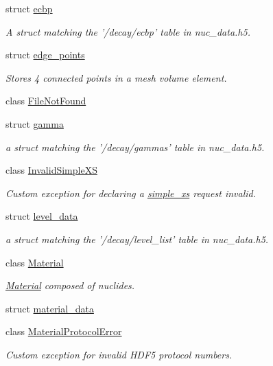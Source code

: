\begin{DoxyCompactItemize}
struct \hyperlink{structpyne_1_1ecbp}{ecbp}
\begin{DoxyCompactList}\small\item\em A struct matching the '/decay/ecbp' table in nuc\+\_\+data.\+h5. \end{DoxyCompactList}\item 
struct \hyperlink{structpyne_1_1edge__points}{edge\+\_\+points}
\begin{DoxyCompactList}\small\item\em Stores 4 connected points in a mesh volume element. \end{DoxyCompactList}\item 
class \hyperlink{classpyne_1_1_file_not_found}{File\+Not\+Found}
\item 
struct \hyperlink{structpyne_1_1gamma}{gamma}
\begin{DoxyCompactList}\small\item\em a struct matching the '/decay/gammas' table in nuc\+\_\+data.\+h5. \end{DoxyCompactList}\item 
class \hyperlink{classpyne_1_1_invalid_simple_x_s}{Invalid\+Simple\+X\+S}
\begin{DoxyCompactList}\small\item\em Custom exception for declaring a \hyperlink{structsimple__xs}{simple\+\_\+xs} request invalid. \end{DoxyCompactList}\item 
struct \hyperlink{structpyne_1_1level__data}{level\+\_\+data}
\begin{DoxyCompactList}\small\item\em a struct matching the '/decay/level\+\_\+list' table in nuc\+\_\+data.\+h5. \end{DoxyCompactList}\item 
class \hyperlink{classpyne_1_1_material}{Material}
\begin{DoxyCompactList}\small\item\em \hyperlink{classpyne_1_1_material}{Material} composed of nuclides. \end{DoxyCompactList}\item 
struct \hyperlink{structpyne_1_1material__data}{material\+\_\+data}
\item 
class \hyperlink{classpyne_1_1_material_protocol_error}{Material\+Protocol\+Error}
\begin{DoxyCompactList}\small\item\em Custom exception for invalid H\+D\+F5 protocol numbers. \end{DoxyCompactList}\item 

\end{DoxyCompactItemize}
